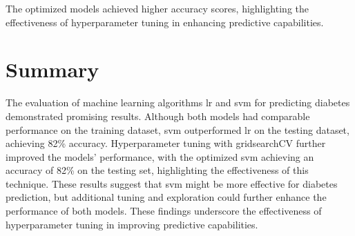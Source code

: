 The optimized models achieved higher accuracy scores, highlighting the effectiveness of hyperparameter tuning in enhancing predictive capabilities.

\section{Summary}
The evaluation of machine learning algorithms lr and svm for predicting diabetes demonstrated promising results. Although both models had comparable performance on the training dataset, svm outperformed lr on the testing dataset, achieving 82\% accuracy. Hyperparameter tuning with gridsearchCV further improved the models' performance, with the optimized svm achieving an accuracy of 82\% on the testing set, highlighting the effectiveness of this technique. These results suggest that svm might be more effective for diabetes prediction, but additional tuning and exploration could further enhance the performance of both models. These findings underscore the effectiveness of hyperparameter tuning in improving predictive capabilities.



